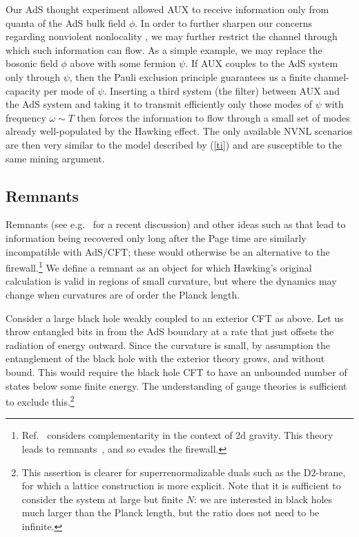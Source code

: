 \documentclass[12pt]{article}
\begin{document}
{{Our AdS thought experiment allowed AUX to receive information only from quanta of the AdS bulk field $\phi$.  In order to further sharpen our concerns regarding
nonviolent nonlocality \cite{Giddings:2011ks,Giddings:2012gc,Giddings:2013kcj}, we may further restrict the channel through which such information can flow. As a simple example, we may replace the bosonic field $\phi$ above with some fermion $\psi$.  If AUX couples to the AdS system only through $\psi$, then the Pauli exclusion principle guarantees us a finite channel-capacity per mode of $\psi$. Inserting a third system (the filter) between AUX and the AdS system and taking it to transmit efficiently only those modes of $\psi$ with frequency $\omega \sim T$ then forces the information to flow through a small set of modes already well-populated by the Hawking effect.  The only available NVNL scenarios are then very similar to the model described by (\ref{ti}) and are susceptible to the same mining argument.

\subsection{Remnants}

Remnants (see e.g.~\cite{Ori:2012jx} for a recent discussion) and other ideas such as \cite{Ashtekar:2005cj} that lead to information being recovered only long after the Page time are similarly incompatible with AdS/CFT; these would otherwise be an alternative to the firewall.\footnote{Ref.~\cite{Kim:2013fv} considers complementarity in the context of 2d gravity.  This theory leads to remnants~\cite{AS}, and so evades the firewall.}  We define a remnant as an object for which Hawking's original calculation is valid in regions of small curvature, but where the dynamics may change when curvatures are of order the Planck length.

Consider a large black hole weakly coupled to an exterior CFT as above.  Let us throw entangled bits in from the AdS boundary at a rate that just offsets the radiation of energy outward.  Since the curvature is small, by assumption the entanglement of the black hole with the exterior theory grows, and without bound.  This would require the black hole CFT to have an unbounded number of states below some finite energy.  The understanding of gauge theories is sufficient to exclude this.\footnote{This assertion is clearer for superrenormalizable duals such as the D2-brane, for which a lattice construction is more explicit.  Note that it is sufficient to consider the system at large but finite $N$: we are interested in black holes much larger than the Planck length, but the ratio does not need to be infinite.}

}}
\end{document}

